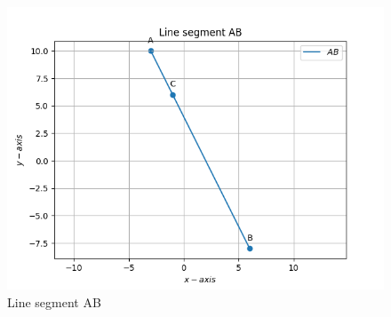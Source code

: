 \documentclass[10pt]{article}
\begin{document}
\begin{figure}[H]
			\centering
			\includegraphics[width=\columnwidth]{figs/Figure_1.png}
			\caption{Line segment AB}
			\label{fig:6}
		\end{figure}
\end{document}
